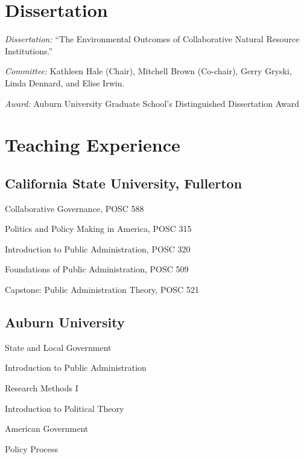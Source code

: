 \documentclass[12pt,letterpaper]{article}
\renewenvironment{itemize}{
  \begin{list}{}{
    \setlength{\leftmargin}{1.5em}
    \setlength{\itemsep}{0.25em}
    \setlength{\parskip}{0pt}
    \setlength{\parsep}{0.25em}
  }
}{
  \end{list}
}
\begin{document}
	


\section*{Dissertation}
    \begin{itemize}\leftmargin=2pt\itemindent=-15pt\leftmargin=2pt\itemindent=-15pt
        \item \emph{Dissertation:} ``The Environmental Outcomes of Collaborative Natural Resource Institutions.'' 
        \item \emph{Committee:} Kathleen Hale (Chair), Mitchell Brown (Co-chair),
        Gerry Gryski, \\Linda Dennard, and Elise Irwin.
        \item \emph{Award:} Auburn University Graduate School's Distinguished Dissertation Award
    \end{itemize}
		
\section*{Teaching Experience}
\leftmargin=2pt\itemindent=-15pt\leftmargin=2pt\itemindent=-15pt
	
\subsection*{California State University, Fullerton}
	\begin{itemize}\leftmargin=2pt\itemindent=-15pt
		\item Collaborative Governance, POSC 588
		\item Politics and Policy Making in America, POSC 315
		\item Introduction to Public Administration, POSC 320
		\item Foundations of Public Administration, POSC 509
		\item Capstone: Public Administration Theory, POSC 521
	\end{itemize}
	
\subsection*{Auburn University}
	\begin{itemize}\leftmargin=2pt\itemindent=-15pt
		\item State and Local Government
		\item Introduction to Public Administration
        \item Research Methods I
        \item Introduction to Political Theory
        \item American Government
        \item Policy Process	
	\end{itemize}
\end{document}
